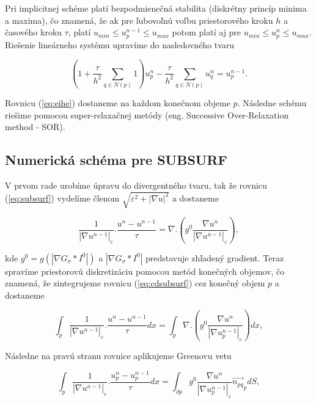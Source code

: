 \documentclass[a4paper,11pt,oneside]{article}%
\def\epsilon{\varepsilon}
\begin{document}
Pri implicitnej schéme platí bezpodmienečná stabilita (diskrétny princíp minima a maxima), čo znamená, že ak pre ľubovoľnú voľbu priestorového kroku $h$ a časového kroku $\tau$, platí $u_{min} \leq u_p^{n - 1} \leq u_{max}$ potom platí aj pre $u_{min} \leq u_p^{n} \leq u_{max}$. Riešenie lineárneho systému upravíme do nasledovného tvaru

\begin{equation} \label{eq:eihe}
(1 + \frac{\tau}{h^2} \sum_{q \in N(p)}1)u_p^n - \frac{\tau}{h^2} \sum_{q \in N(p)}u_q^n = u_p^{n - 1}.
\end{equation}

Rovnicu (\ref{eq:eihe}) dostaneme na každom konečnom objeme $p$. Následne schému riešime pomocou super-relaxačnej metódy (eng. Successive Over-Relaxation method - SOR). 

\subsection{Numerická schéma pre SUBSURF}

V prvom rade urobíme úpravu do divergentného tvaru, tak že rovnicu (\ref{eq:subsurf}) vydelíme členom $\sqrt{\epsilon^2 + |\nabla u|^2}$ a dostaneme

\begin{equation} \label{eq:cdsubsurf}
\frac{1}{|\nabla u^{n-1}|_{\epsilon}}.\frac{u^n-u^{n-1}}{\tau} = \nabla.(g^0\frac{\nabla u^n}{|\nabla u^{n-1}|_{\epsilon}}),
\end{equation}

kde $g^0 = g(|\nabla G_{\sigma}*I^0|)$ a $|\nabla G_{\sigma}*I^0|$ predstavuje zhľadený gradient. Teraz spravíme priestorovú diskretizáciu pomocou metód konečných objemov, čo znamená, že zintegrujeme rovnicu (\ref{eq:cdsubsurf}) cez konečný objem $p$ a dostaneme

\begin{equation}
\int_{p}\frac{1}{|\nabla u^{n-1}|_{\epsilon}}.\frac{u^n-u^{n-1}}{\tau}dx = \int_{p}\nabla.(g^0\frac{\nabla u^n}{|\nabla u_p^{n-1}|_{\epsilon}})dx,
\end{equation}

Následne na pravú stranu rovnice aplikujeme Greenovu vetu

\begin{equation} \label{greensubsurf}
\int_{p}\frac{1}{|\nabla u^{n-1}|_{\epsilon}}.\frac{u_p^n-u_p^{n-1}}{\tau}dx = \int_{\partial p} g^0\frac{\nabla u^n}{|\nabla u_p^{n-1}|_{\epsilon}}\vec{n_{pq}}_pdS,
\end{equation}
\end{document}
